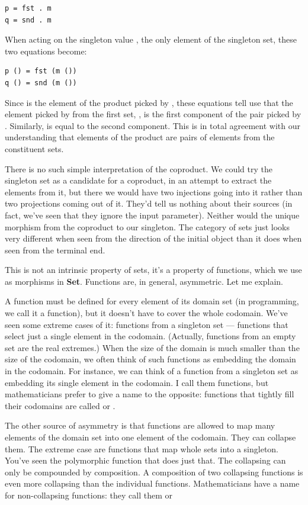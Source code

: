 \begin{verbatim}
p = fst . m
q = snd . m
\end{verbatim}
When acting on the singleton value \code{()}, the only element of the
singleton set, these two equations become:

\begin{verbatim}
p () = fst (m ())
q () = snd (m ())
\end{verbatim}
Since  is the element of the product picked by ,
these equations tell use that the element picked by  from the
first set, , is the first component of the pair picked by
. Similarly,  is equal to the second component.
This is in total agreement with our understanding that elements of the
product are pairs of elements from the constituent sets.

There is no such simple interpretation of the coproduct. We could try
the singleton set as a candidate for a coproduct, in an attempt to
extract the elements from it, but there we would have two injections
going into it rather than two projections coming out of it. They'd tell
us nothing about their sources (in fact, we've seen that they ignore the
input parameter). Neither would the unique morphism from the coproduct
to our singleton. The category of sets just looks very different when
seen from the direction of the initial object than it does when seen
from the terminal end.

This is not an intrinsic property of sets, it's a property of functions,
which we use as morphisms in \textbf{Set}. Functions are, in general,
asymmetric. Let me explain.

A function must be defined for every element of its domain set (in
programming, we call it a  function), but it doesn't have to
cover the whole codomain. We've seen some extreme cases of it: functions
from a singleton set --- functions that select just a single element in
the codomain. (Actually, functions from an empty set are the real
extremes.) When the size of the domain is much smaller than the size of
the codomain, we often think of such functions as embedding the domain
in the codomain. For instance, we can think of a function from a
singleton set as embedding its single element in the codomain. I call
them  functions, but mathematicians prefer to give a
name to the opposite: functions that tightly fill their codomains are
called  or .

The other source of asymmetry is that functions are allowed to map many
elements of the domain set into one element of the codomain. They can
collapse them. The extreme case are functions that map whole sets into a
singleton. You've seen the polymorphic  function that does
just that. The collapsing can only be compounded by composition. A
composition of two collapsing functions is even more collapsing than the
individual functions. Mathematicians have a name for non-collapsing
functions: they call them  or 

